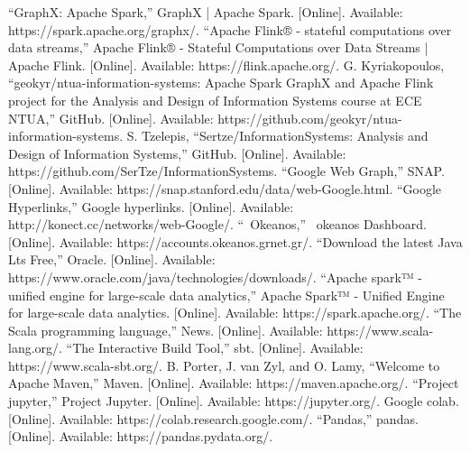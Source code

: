 \documentclass[conference]{IEEEtran}
\begin{document}
\begin{thebibliography}{00}
 “GraphX: Apache Spark,” GraphX | Apache Spark. [Online]. Available: https://spark.apache.org/graphx/.
 “Apache Flink® - stateful computations over data streams,” Apache Flink® - Stateful Computations over Data Streams | Apache Flink. [Online]. Available: https://flink.apache.org/.
 G. Kyriakopoulos, “geokyr/ntua-information-systems: Apache Spark GraphX and Apache Flink project for the Analysis and Design of Information Systems course at ECE NTUA,” GitHub. [Online]. Available: https://github.com/geokyr/ntua-information-systems. 
 S. Tzelepis, “Sertze/InformationSystems: Analysis and Design of Information Systems,” GitHub. [Online]. Available: https://github.com/SerTze/InformationSystems.
 “Google Web Graph,” SNAP. [Online]. Available: https://snap.stanford.edu/data/web-Google.html.
 “Google Hyperlinks,” Google hyperlinks. [Online]. Available: http://konect.cc/networks/web-Google/.
 “~Okeanos,” ~okeanos Dashboard. [Online]. Available: https://accounts.okeanos.grnet.gr/.
 “Download the latest Java Lts Free,” Oracle. [Online]. Available: https://www.oracle.com/java/technologies/downloads/. 
 “Apache spark™ - unified engine for large-scale data analytics,” Apache Spark™ - Unified Engine for large-scale data analytics. [Online]. Available: https://spark.apache.org/.
 “The Scala programming language,” News. [Online]. Available: https://www.scala-lang.org/.
 “The Interactive Build Tool,” sbt. [Online]. Available: https://www.scala-sbt.org/.
 B. Porter, J. van Zyl, and O. Lamy, “Welcome to Apache Maven,” Maven. [Online]. Available: https://maven.apache.org/. 
 “Project jupyter,” Project Jupyter. [Online]. Available: https://jupyter.org/.
 Google colab. [Online]. Available: https://colab.research.google.com/.
 “Pandas,” pandas. [Online]. Available: https://pandas.pydata.org/.
\end{thebibliography}
\end{document}
